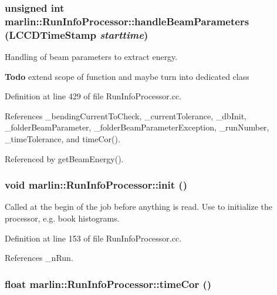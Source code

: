 \subsubsection[{handleBeamParameters}]{\setlength{\rightskip}{0pt plus 5cm}unsigned int marlin::RunInfoProcessor::handleBeamParameters (LCCDTimeStamp {\em starttime})\hspace{0.3cm}{\ttfamily  [private]}}\label{classmarlin_1_1RunInfoProcessor_a6f3f736a349f45536e3fc13344536950}


Handling of beam parameters to extract energy. \begin{Desc}
\item[{\bf Todo}]extend scope of function and maybe turn into dedicated class \end{Desc}


Definition at line 429 of file RunInfoProcessor.cc.

References \_\-bendingCurrentToCheck, \_\-currentTolerance, \_\-dbInit, \_\-folderBeamParameter, \_\-folderBeamParameterException, \_\-runNumber, \_\-timeTolerance, and timeCor().

Referenced by getBeamEnergy().
\subsubsection[{init}]{\setlength{\rightskip}{0pt plus 5cm}void marlin::RunInfoProcessor::init ()\hspace{0.3cm}{\ttfamily  [virtual]}}\label{classmarlin_1_1RunInfoProcessor_a51fa73bd662dbffa2d89a04fdd2e92da}


Called at the begin of the job before anything is read. Use to initialize the processor, e.g. book histograms. 

Definition at line 153 of file RunInfoProcessor.cc.

References \_\-nRun.
\subsubsection[{timeCor}]{\setlength{\rightskip}{0pt plus 5cm}float marlin::RunInfoProcessor::timeCor ()\hspace{0.3cm}{\ttfamily  [private]}}\label{classmarlin_1_1RunInfoProcessor_a0070ee9315271f15a55ae80c4bb50acc}


